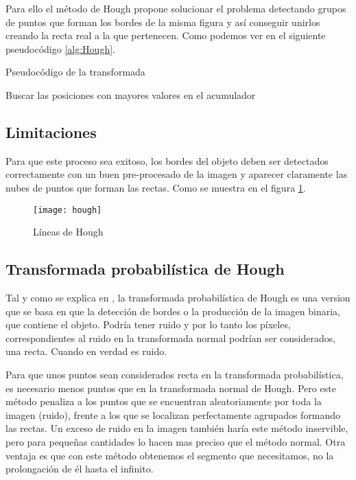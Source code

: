 Para ello el método de Hough propone solucionar el problema detectando grupos de puntos que forman los bordes de la misma figura y así conseguir unirlos creando la recta real a la que pertenecen. Como podemos ver en el siguiente pseudocódigo 
\ref{alg:Hough}.

\label{alg:Hough}
\begin{algorithm*}
\caption{Pseudocódigo de la transformada}
\DontPrintSemicolon
{}


Buscar las posiciones con mayores valores en el acumulador\;	

\end{algorithm*}

\subsection{Limitaciones}
Para que este proceso sea exitoso, los bordes del objeto deben ser detectados correctamente con un buen pre-procesado de la imagen y aparecer claramente las nubes de puntos que forman las rectas.
Como se muestra en el figura \ref{fig:3.5}.

\begin{figure}[h]
\centering
\texttt{[image: hough]}
\caption{Líneas de Hough~\cite{opencv:HoughIm}}
\label{fig:3.5}
\end{figure}
\subsection{Transformada probabilística de Hough}

Tal y como se explica en \cite{Kiryati20001157}, la transformada probabilística de Hough es una version que se basa en que la detección de bordes o la producción de la imagen binaria, que contiene el objeto. Podría tener ruido y por lo tanto los píxeles, correspondientes al ruido en la transformada normal podrían ser considerados, una recta. Cuando en verdad es ruido.

Para que unos puntos sean considerados recta en la transformada probabilística, es necesario menos puntos que en la transformada normal de Hough.
Pero este método penaliza a los puntos que se encuentran aleatoriamente por toda la imagen (ruido), frente a los que se localizan perfectamente agrupados formando las rectas. 
Un exceso de ruido en la imagen también haría este método inservible, pero para pequeñas cantidades lo hacen mas preciso que el método normal.
Otra ventaja es que con este método obtenemos el segmento que necesitamos, no la prolongación de él hasta el infinito.

